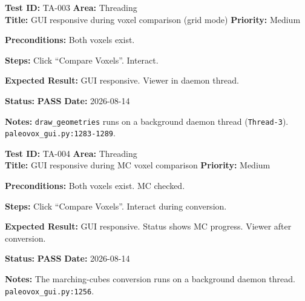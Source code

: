 \documentclass[12pt,a4paper]{article}
\newcommand{\pass}{\textcolor{paleogreen}{\textbf{PASS}}}
\newcommand{\testheader}[4]{%
  \smallskip
  \noindent\textbf{Test ID:} #1 \hfill \textbf{Area:} #2 \\
  \textbf{Title:} #3 \hfill \textbf{Priority:} #4
}
\newenvironment{testbody}{%
  \begin{description}[leftmargin=2em,style=nextline]
}{%
  \end{description}
  \smallskip
}
\begin{document}
\testheader{TA-003}{Threading}{GUI responsive during voxel comparison (grid mode)}{Medium}
\begin{testbody}
  \item[\textbf{Preconditions:}] Both voxels exist.
  \item[\textbf{Steps:}] Click ``Compare Voxels''. Interact.
  \item[\textbf{Expected Result:}] GUI responsive. Viewer in daemon thread.
  \item[\textbf{Status:}] \pass{} \hspace{1em} \textbf{Date:} 2026-08-14
  \item[\textbf{Notes:}] \texttt{draw\_geometries} runs on a background daemon
        thread (\texttt{Thread-3}). \texttt{paleovox\_gui.py:1283-1289}.
\end{testbody}

\testheader{TA-004}{Threading}{GUI responsive during MC voxel comparison}{Medium}
\begin{testbody}
  \item[\textbf{Preconditions:}] Both voxels exist. MC checked.
  \item[\textbf{Steps:}] Click ``Compare Voxels''. Interact during conversion.
  \item[\textbf{Expected Result:}] GUI responsive. Status shows MC progress.
        Viewer after conversion.
  \item[\textbf{Status:}] \pass{} \hspace{1em} \textbf{Date:} 2026-08-14
  \item[\textbf{Notes:}] The marching-cubes conversion runs on a background
        daemon thread. \texttt{paleovox\_gui.py:1256}.
\end{testbody}
\end{document}
